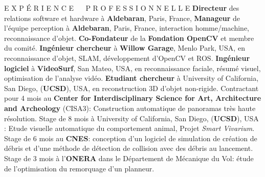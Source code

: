 




\begin{rubric}{E X P \'{E} R I E N C E ~~ P R O F E S S I O N N E L L E}
\entry*[2014--maintenant]%
  \textbf{Directeur} des relations software et hardware \`{a} \textbf{Aldebaran}, Paris, France,
\entry*[2013--2014]%
  \textbf{Manageur} de l'\'{e}quipe perception \`{a} \textbf{Aldebaran}, Paris, France,
interaction homme/machine, reconnaissance d'objet.
\entry*[2012--maintenant]%
  \textbf{Co-Fondateur} de la \textbf{Fondation OpenCV} et membre du comit\'{e}.
\entry*[2011--2013]%
  \textbf{Ing\'{e}nieur chercheur} \`{a} \textbf{Willow Garage}, Menlo Park,
USA,
en reconnaissance d'objet, SLAM, d\'{e}veloppement d'OpenCV et ROS.
\entry*[2009--2011]%
  \textbf{Ing\'{e}nieur logiciel} \`{a} \textbf{VideoSurf}, San Mateo, USA,
en reconnaissance faciale, r\'{e}sum\'{e} visuel, optimisation de l'analyse
vid\'{e}o.
\entry*[2004--2009]%
  \textbf{Etudiant chercheur} \`{a} University of
California, San Diego, (\textbf{UCSD}), USA, en reconstruction 3D d'objet
non-rigide.
\entry*[2007]
  Contractant pour 4 mois au \textbf{Center for Interdisciplinary Science for Art, Architecture and Archeology} (CISA3): Construction automatique de panoramas tr\`{e}s haute r\'{e}solution.
\entry*[2003]
  Stage de 8 mois \`{a} University of California, San Diego,  (\textbf{UCSD}), USA : Etude visuelle automatique du comportement animal, Projet {\em Smart Vivarium}.
\entry*[2002]
  Stage de 6 mois au \textbf{CNES}: conception d'un logiciel de simulation de cr\'{e}ation de d\'{e}bris et d'une m\'{e}thode de d\'{e}tection de collision avec des d\'{e}bris au lancement.
\entry*[2002]
  Stage de 3 mois \`{a} l'\textbf{ONERA} dans le D\'{e}partement de M\'{e}canique du
Vol: \'e{tude} de l'optimisation du remorquage d'un planneur.

\end{rubric}
